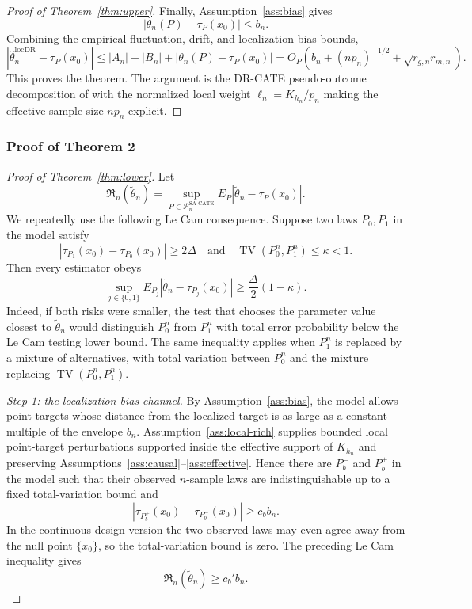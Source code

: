 \documentclass[11pt]{article}
\theoremstyle{definition}
\theoremstyle{plain}
\theoremstyle{remark}
\begin{document}
\begin{proof}[Proof of Theorem~\ref{thm:upper}]
Finally, Assumption~\ref{ass:bias} gives
\[
  |\theta_n(P)-\tau_P(x_0)|\le b_n.
\]
Combining the empirical fluctuation, drift, and localization-bias bounds,
\[
  |\hat\theta_n^{\mathrm{locDR}}-\tau_P(x_0)|
  \le |A_n|+|B_n|+|\theta_n(P)-\tau_P(x_0)|
  =
  O_P\!\left(b_n+(n p_n)^{-1/2}+\sqrt{r_{g,n}r_{m,n}}\right).
\]
This proves the theorem. The argument is the DR-CATE pseudo-outcome decomposition of
\citet{Kennedy2023DRCATE} with the normalized local weight $\ell_n=K_{h_n}/p_n$ making the effective
sample size $n p_n$ explicit.
\end{proof}

\subsubsection*{Proof of Theorem 2}
\begin{proof}[Proof of Theorem~\ref{thm:lower}]
Let
\[
  \mathfrak R_n(\tilde\theta_n)
  =
  \sup_{P\in\mathcal{P}_n^{\mathrm{SA\text{-}CATE}}}
  E_P|\tilde\theta_n-\tau_P(x_0)|.
\]
We repeatedly use the following Le Cam consequence. Suppose two laws $P_0,P_1$ in the model satisfy
\[
  |\tau_{P_1}(x_0)-\tau_{P_0}(x_0)|\ge 2\Delta
  \quad\text{and}\quad
  \operatorname{TV}(P_0^n,P_1^n)\le \kappa<1 .
\]
Then every estimator obeys
\[
  \sup_{j\in\{0,1\}}E_{P_j}|\tilde\theta_n-\tau_{P_j}(x_0)|
  \ge
  \frac{\Delta}{2}(1-\kappa).
\]
Indeed, if both risks were smaller, the test that chooses the parameter value closest to $\tilde\theta_n$ would distinguish $P_0^n$ from $P_1^n$ with total error probability below the Le Cam testing lower bound. The same inequality applies when $P_1^n$ is replaced by a mixture of alternatives, with total variation between $P_0^n$ and the mixture replacing $\operatorname{TV}(P_0^n,P_1^n)$.

\emph{Step 1: the localization-bias channel.}
By Assumption~\ref{ass:bias}, the model allows point targets whose distance from the localized target is as large as a constant multiple of the envelope $b_n$. Assumption~\ref{ass:local-rich} supplies bounded local point-target perturbations supported inside the effective support of $K_{h_n}$ and preserving Assumptions~\ref{ass:causal}--\ref{ass:effective}. Hence there are $P_b^-$ and $P_b^+$ in the model such that their observed $n$-sample laws are indistinguishable up to a fixed total-variation bound and
\[
  |\tau_{P_b^+}(x_0)-\tau_{P_b^-}(x_0)|\ge c_b b_n .
\]
In the continuous-design version the two observed laws may even agree away from the null point $\{x_0\}$, so the total-variation bound is zero. The preceding Le Cam inequality gives
\[
  \mathfrak R_n(\tilde\theta_n)\ge c_b' b_n .
\]


\end{proof}
\end{document}
